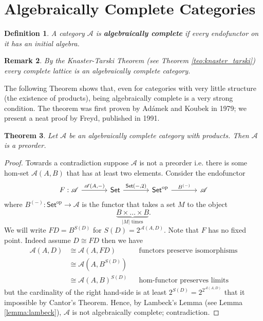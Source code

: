 \documentclass[letterpaper, 11pt, oneside]{memoir}
\theoremstyle{myteo}
\newtheorem{theorem}{Theorem}[section]
\newtheorem{definition}[theorem]{Definition}
\newtheorem{remark}[theorem]{Remark}
\numberwithin{equation}{section}
\newcommand{\marginnote}[1]{\marginpar{\footnotesize #1}}
\newcommand{\Set}{\textsf{Set}}
\newcommand{\op}{\text{op}}
\newcommand{\A}{\mathscr{A}}
\begin{document}
\section{Algebraically Complete Categories}

\begin{definition}
  A category \(\A\) is \textbf{algebraically complete} \marginnote{algebraically complete category} if every endofunctor on it has an initial algebra.
\end{definition}

\begin{remark}
  By the Knaster-Tarski Theorem (see Theorem \ref{teo:knaster_tarski}) every complete lattice is an algebraically complete category.
\end{remark}

The following Theorem shows that, even for categories with very little structure (the existence of products), being algebraically complete is a very strong condition.
The theorem was first proven by Adámek and Koubek in 1979; we present a neat proof by Freyd, published in 1991.

\begin{theorem}
  Let \(\A\) be an algebraically complete category with products.
  Then \(\A\) is a preorder.
\end{theorem}

\begin{proof}
  Towards a contradiction suppose \(\A\) is not a preorder i.e. there is some hom-set \(\A(A, B)\) that has at least two elements.
  Consider the endofunctor
  \begin{equation*}
    \begin{tikzcd}[sep=large]
      F : \A \ar[r, "{\A(A, -)}"] & \Set \ar[r, "{\Set(-, 2)}"] & \Set^\op \ar[r, "B^{(-)}"] & \A
    \end{tikzcd}
  \end{equation*}
  where \(B^{(-)}: \Set^\op \to \A\) is the functor that takes a set \(M\) to the object
  \begin{equation*}
    \underbrace{B \times \ldots \times B}_{|M| \text{ times}}.
  \end{equation*}
  We will write \(FD = B^{S(D)}\) for \(S(D) = 2^{\A(A, D)}\).
  Note that \(F\) has no fixed point.
  Indeed assume \(D \cong FD\) then we have
  \begin{align*}
    \A(A, D) & \cong \A(A, FD) && \text{functors preserve isomorphisms}\\
             & \cong \A(A, B^{S(D)}) &&\\
             & \cong \A(A, B)^{S(D)} && \text{hom-functor preserves limits}
  \end{align*}
  but the cardinality of the right hand-side is at least \(2^{S(D)} = 2^{2^{\A(A, D)}}\) that it impossible by Cantor's Theorem.
  Hence, by Lambeck's Lemma (see Lemma \ref{lemma:lambeck}), \(\A\) is not algebraically complete; contradiction.
\end{proof}
\end{document}
